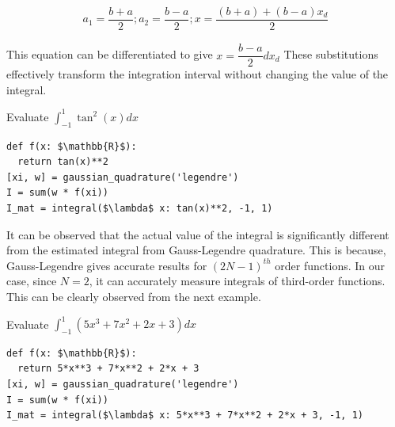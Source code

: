 \documentclass[book.tex]{subfiles}
\begin{document}
\begin{align}
	a_1 = \dfrac{b+a}{2} ; a_2 = \dfrac{b-a}{2};  x = \dfrac{(b+a) + (b-a)x_d}{2}
\end{align}

This equation can be differentiated to give $ x = \dfrac{b-a}{2}dx_d$
These substitutions effectively transform the integration interval without changing the value of the integral.

\begin{example}
Evaluate $ \int_{-1}^{1}\tan^2(x)dx$


\begin{lstlisting}
def f(x: $\mathbb{R}$):
  return tan(x)**2
[xi, w] = gaussian_quadrature('legendre')
I = sum(w * f(xi))
I_mat = integral($\lambda$ x: tan(x)**2, -1, 1)
\end{lstlisting}

%	
%	
%	
\end{example}

It can be observed that the actual value of the integral is significantly different from the estimated integral from Gauss-Legendre quadrature. This is because, Gauss-Legendre gives accurate results for $(2N-1)^{th}$ order functions. In our case, since $N=2$, it can accurately measure integrals of third-order functions. This can be clearly observed from the next example. 

\begin{example}
Evaluate $ \int_{-1}^{1}(5x^3 + 7x^2 +  2x + 3)dx$


\begin{lstlisting}
def f(x: $\mathbb{R}$):
  return 5*x**3 + 7*x**2 + 2*x + 3
[xi, w] = gaussian_quadrature('legendre')
I = sum(w * f(xi))
I_mat = integral($\lambda$ x: 5*x**3 + 7*x**2 + 2*x + 3, -1, 1)
\end{lstlisting}
%
\end{example}
\end{document}
